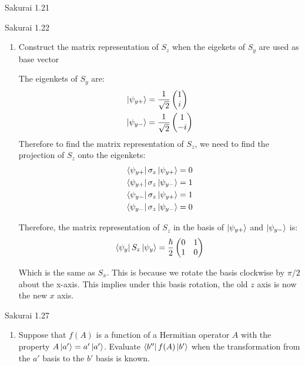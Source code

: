 \documentclass{article}
\begin{document}
\begin{section}{Sakurai 1.21}
\begin{section}{Sakurai 1.22}
\begin{enumerate}
	\item Construct the matrix representation of $S_z$ when the eigekets of $S_y$ are used as base vector

	\begin{tcolorbox}
		The eigenkets of $S_y$ are:
		\begin{align*}
			\ket{\psi_{y+}} & = \frac{1}{\sqrt{2}} \begin{pmatrix} 1 \\ i \end{pmatrix}  \\
			\ket{\psi_{y-}} & = \frac{1}{\sqrt{2}} \begin{pmatrix} 1 \\ -i \end{pmatrix}
		\end{align*}
		Therefore to find the matrix representation of $S_z$, we need to find the projection of $S_z$ onto the eigenkets:
		\begin{align*}
			\bra{\psi_{y+}}{\sigma_z}\ket{\psi_{y+}} = 0 \\
			\bra{\psi_{y+}}{\sigma_z}\ket{\psi_{y-}} = 1 \\
			\bra{\psi_{y-}}{\sigma_z}\ket{\psi_{y+}} = 1 \\
			\bra{\psi_{y-}}{\sigma_z}\ket{\psi_{y-}} = 0
		\end{align*}

		Therefore, the matrix representation of $S_z$ in the basis of $\ket{\psi_{y+}}$ and $\ket{\psi_{y-}}$ is:
		\begin{align*}
			\bra{\psi_y}S_z\ket{\psi_y} = \frac{\hbar}{2}
			\begin{pmatrix}
				0 & 1 \\
				1 & 0
			\end{pmatrix}
		\end{align*}

		Which is the same as $S_x$. This is because we rotate the basis clockwise by $\pi/2$ about the x-axis. This implies under this basis rotation, the old $z$ axis is now the new $x$ axis.
	\end{tcolorbox}
\end{enumerate}
\end{section}

\begin{section}{Sakurai 1.27}
\begin{enumerate}
	\item Suppose that $f(A)$ is a function of a Hermitian operator $A$ with the property $A\ket{a'} = a'\ket{a'}$. Evaluate $\bra{b''}{f(A)}\ket{b'}$ when the transformation from the $a'$ basis to the $b'$ basis is known.


\end{enumerate}
\end{section}
\end{section}
\end{document}
